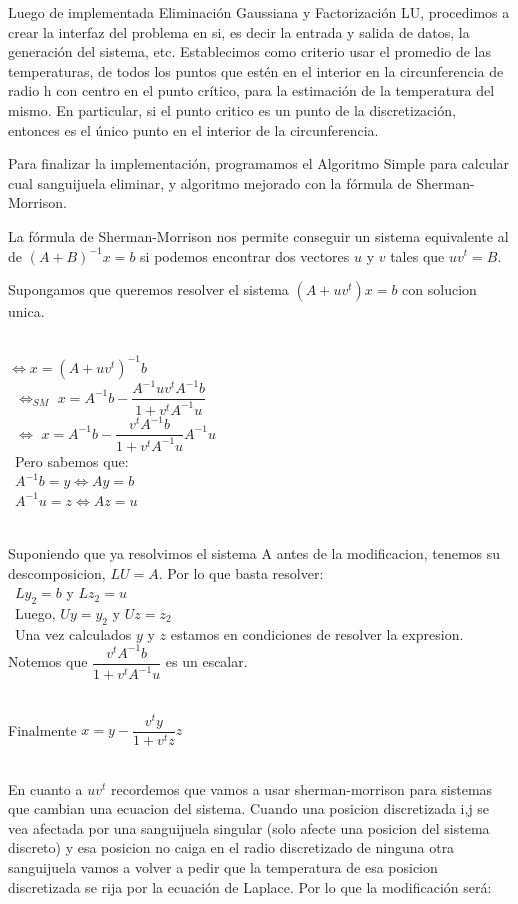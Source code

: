 Luego de implementada Eliminación Gaussiana y Factorizaci\'on LU, procedimos a crear la interfaz del problema en si, es decir la entrada y salida de datos, la generación del sistema, etc. Establecimos como criterio usar el promedio de las temperaturas, de todos los puntos que estén en el interior en la circunferencia de radio h con centro en el punto crítico, para la estimación de la temperatura del mismo. En particular, si el punto critico es un punto de la discretizaci\'on, entonces es el único punto en el interior de la circunferencia.


Para finalizar la implementación, programamos el Algoritmo Simple para calcular cual sanguijuela eliminar, y algoritmo mejorado con la fórmula de Sherman-Morrison. 

La fórmula de Sherman-Morrison nos permite conseguir un sistema equivalente al de $(A+B)^{-1}x=b$ si podemos encontrar dos vectores $u$ y $v$ tales que $uv^t=B$.

  Supongamos que queremos resolver el sistema $  (A + uv^{t})x = b $ con solucion unica. \\\ 
   
 $\iff x = (A + uv^{t})^{-1} b$   \\\
 $\iff_{SM} $ $ x = A^{-1}b -  \dfrac{A^{-1}u v^{t}A^{-1}b}{1+v^{t}A^{-1}u}$ \\\
$\iff $ $ x = A^{-1}b -  \dfrac{v^{t}A^{-1}b}{1+v^{t}A^{-1}u} A^{-1}u $\\\
Pero sabemos que: \\\
$A^{-1}b = y \iff Ay = b$ \\\
$A^{-1}u = z \iff Az = u$ \\\

Suponiendo que ya resolvimos el sistema A antes de la modificacion, tenemos su descomposicion, $ LU=A $. Por lo que basta resolver: \\\
$Ly_{2}= b $ y $ Lz_{2} = u$ \\\
Luego, $ Uy=y_{2} $ y $ Uz=z_{2}$ \\\
Una vez calculados $ y $ y $ z $ estamos en condiciones de resolver la expresion. Notemos que $ \dfrac{v^{t}A^{-1}b}{1+v^{t}A^{-1}u} $ es un escalar. \\\

Finalmente $ x = y - \dfrac{v^{t}y}{1+v^{t}z} z$ \\\

En cuanto a $ uv^{t} $ recordemos que vamos a usar sherman-morrison para sistemas que cambian una ecuacion del sistema. Cuando una posicion discretizada i,j se vea afectada por una sanguijuela singular (solo afecte una posicion del sistema discreto) y esa posicion no caiga en el radio discretizado de ninguna otra sanguijuela vamos a volver a pedir que la temperatura de esa posicion discretizada se rija por la ecuaci\'on de Laplace. Por lo que la modificaci\'on ser\'a:  \\\

